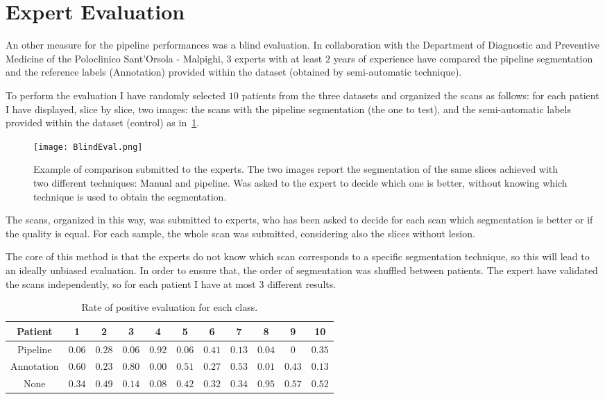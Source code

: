 \documentclass{standalone}
\begin{document}
	\section{Expert Evaluation}
	
	An other measure for the pipeline performances was a blind evaluation. In collaboration with the Department of Diagnostic and Preventive Medicine of the Poloclinico Sant'Orsola - Malpighi, $3$ experts with at least $2$ years of experience have compared the pipeline segmentation and the reference labels (Annotation) provided within the dataset (obtained by semi-automatic technique). 
	
	To perform the evaluation I have randomly selected $10$ patients from the three datasets and organized the scans as follows:
	for each patient I have displayed, slice by slice,  two images: the scans with the pipeline segmentation (the one to test), and the semi-automatic labels provided within the dataset (control) as in \figurename\,\ref{fig:Blind}.
	
	\begin{figure}[h!]
		\centering
		\texttt{[image: BlindEval.png]}
		\caption{Example of comparison submitted to the experts. The two images report the segmentation of the same slices achieved with two different techniques: Manual and pipeline. Was asked to the expert to decide which one is better, without knowing which technique is used to obtain the segmentation.}\label{fig:Blind}
	\end{figure}

	The scans, organized in this way, was submitted to experts, who has been asked to decide for each scan which segmentation is better or if the quality is equal. For each sample, the whole scan was submitted, considering also the slices without lesion. 
	
	The core of this method is that the experts do not know which scan corresponds to a specific segmentation technique, so this will lead to an ideally unbiased evaluation. In order to ensure that, the order of segmentation was shuffled between patients. The expert have validated the scans independently, so for each patient I have at most $3$ different results. 
	

	\begin{table}[h!]
		\begin{tabular}{|c|c|c|c|c|c|c|c|c|c|c|}
			\hline
			Patient  	& 1  	 & 2  	  & 3  	   & 4    	& 5  	& 6   	 & 7  	  & 8  		& 9  	& 10	 \\ \hline
			Pipeline	& $0.06$ & $0.28$ & $0.06$ & $0.92$ & $0.06$& $0.41$ & $0.13$ & $0.04$  & $0$ 	& $0.35$ \\ 
			Annotation	& $0.60$ & $0.23$ & $0.80$ & $0.00$	& $0.51$& $0.27$ & $0.53$ & $0.01$  & $0.43$& $0.13$ \\ 
			None		& $0.34$ & $0.49$ & $0.14$ & $0.08$ & $0.42$& $0.32$ & $0.34$ & $0.95$	& $0.57$& $0.52$ \\ \hline
		\end{tabular}\caption{Rate of positive evaluation for each class.   }\label{tab:blind}
	\end{table}
\end{document}
